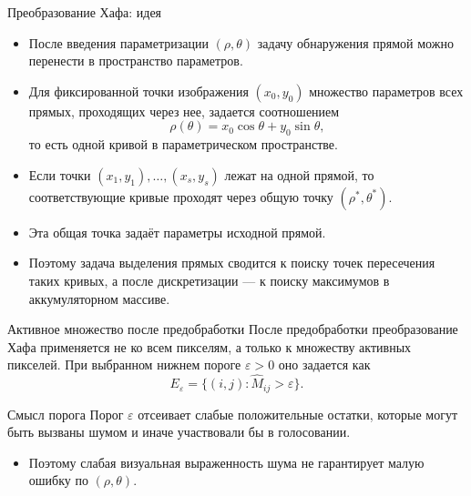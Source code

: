 \documentclass[unicode,notheorems]{beamer}
\begin{document}
\begin{frame}{Преобразование Хафа: идея}
	\begin{itemize}
		\item После введения параметризации $(\rho,\theta)$ задачу обнаружения прямой можно перенести в пространство параметров.
		\item Для фиксированной точки изображения $(x_0,y_0)$ множество параметров всех прямых, проходящих через нее, задается соотношением
		\[
		\rho(\theta) = x_0 \cos \theta + y_0 \sin \theta,
		\]
		то есть одной кривой в параметрическом пространстве.
		\item Если точки $(x_1,y_1),\dots,(x_s,y_s)$ лежат на одной прямой, то соответствующие кривые проходят через общую точку $(\rho^\ast,\theta^\ast)$.
		\item Эта общая точка задаёт параметры исходной прямой.
		\item Поэтому задача выделения прямых сводится к поиску точек пересечения таких кривых, а после дискретизации --- к поиску максимумов в аккумуляторном массиве.
	\end{itemize}
\end{frame}

\begin{frame}{Активное множество после предобработки}
	\small
	После предобработки преобразование Хафа применяется не ко всем пикселям, а только к множеству активных пикселей.
	При выбранном нижнем пороге $\varepsilon>0$ оно задается как
	\[
	E_{\varepsilon} = \{(i,j): \widehat{M}_{ij} > \varepsilon\}.
	\]

	\begin{block}{Смысл порога}
		Порог $\varepsilon$ отсеивает слабые положительные остатки, которые могут быть вызваны шумом и иначе участвовали бы в голосовании.
	\end{block}

	\begin{itemize}
		\item Поэтому слабая визуальная выраженность шума не гарантирует малую ошибку по $(\rho,\theta)$.
	\end{itemize}
\end{frame}
\end{document}
